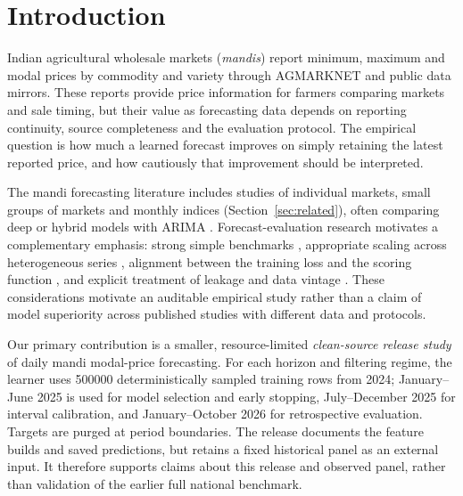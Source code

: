 \section{Introduction}\label{sec:intro}

Indian agricultural wholesale markets (\emph{mandis}) report minimum, maximum and modal prices by commodity and variety through AGMARKNET and public data mirrors.
These reports provide price information for farmers comparing markets and sale timing, but their value as forecasting data depends on reporting continuity, source completeness and the evaluation protocol.
The empirical question is how much a learned forecast improves on simply retaining the latest reported price, and how cautiously that improvement should be interpreted.

The mandi forecasting literature includes studies of individual markets, small groups of markets and monthly indices (Section~\ref{sec:related}), often comparing deep or hybrid models with ARIMA \cite{paul2022brinjal,manogna2025deep,kumar2021onion}.
Forecast-evaluation research motivates a complementary emphasis: strong simple benchmarks \cite{makridakis2018statistical,makridakis2020m4}, appropriate scaling across heterogeneous series \cite{hyndman2006another}, alignment between the training loss and the scoring function \cite{gneiting2011making,kolassa2016evaluating}, and explicit treatment of leakage and data vintage \cite{hewamalage2022pitfalls,bokun2023fredsd}.
These considerations motivate an auditable empirical study rather than a claim of model superiority across published studies with different data and protocols.

Our primary contribution is a smaller, resource-limited \emph{clean-source release study} of daily mandi modal-price forecasting.
For each horizon and filtering regime, the learner uses \num{500000} deterministically sampled training rows from 2024; January--June 2025 is used for model selection and early stopping, July--December 2025 for interval calibration, and January--October 2026 for retrospective evaluation.
Targets are purged at period boundaries.
The release documents the feature builds and saved predictions, but retains a fixed historical panel as an external input.
It therefore supports claims about this release and observed panel, rather than validation of the earlier full national benchmark.

